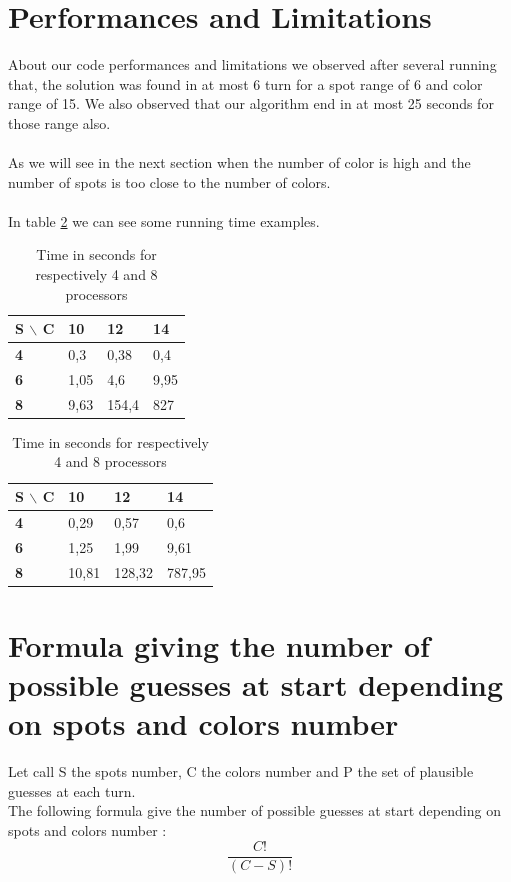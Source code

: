 \section{Performances and Limitations}
About our code performances and limitations we observed after several running that,
the solution was found in at most 6 turn for a spot range of 6 and color range of 15.
We also observed that our algorithm end in at most 25 seconds for those range also.

\paragraph{}
As we will see in the next section when the number of color is high and
the number of spots is too close to the number of colors.

\paragraph{}
In table \ref{table1} we can see some running time examples.

\begin{table}[]
	\caption{Time in seconds for respectively 4 and 8 processors}
	\label{table1}
	\begin{tabular}{|l|l|l|l|}
		\hline
		S $\backslash$ C       & \textbf{10} & \textbf{12} & \textbf{14} \\ \hline
		\textbf{4} & 0,3         & 0,38        & 0,4         \\ \hline
		\textbf{6} & 1,05        & 4,6         & 9,95        \\ \hline
		\textbf{8} & 9,63        & 154,4       & 827         \\ \hline
	\end{tabular}
	\begin{tabular}{|l|l|l|l|}
		\hline
		S $\backslash$ C       & \textbf{10} & \textbf{12} & \textbf{14} \\ \hline
		\textbf{4} & 0,29         & 0,57        & 0,6         \\ \hline
		\textbf{6} & 1,25        & 1,99       & 9,61        \\ \hline
		\textbf{8} & 10,81        & 128,32       & 787,95         \\ \hline
	\end{tabular}
	\end{table}

\section{Formula giving the number of possible guesses at start depending on spots and 
colors number}
Let call S the spots number, C the colors number and P the set of plausible guesses at each turn. \\
The following formula give the number of possible guesses at start depending on spots and 
colors number : \\
\[
	\frac{C!}{(C-S)!}
\] 

